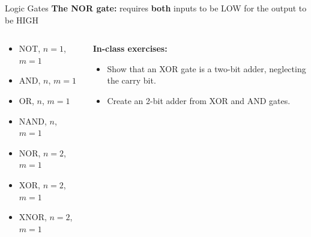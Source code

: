 \documentclass{beamer}
\begin{document}
\begin{frame}{Logic Gates}
\textbf{The NOR gate:} requires \textbf{both} inputs to be LOW for the output to be HIGH \\ \vspace{0.5cm}
\begin{columns}[T]
\begin{column}{0.5\textwidth}
\begin{itemize}
\item \alert{NOT, $n=1$, $m=1$}
\item \alert{AND, $n$, $m=1$}
\item \alert{OR, $n$, $m=1$}
\item \alert{NAND, $n$, $m=1$}
\item \alert{NOR, $n=2$, $m=1$}
\item \alert{XOR, $n=2$, $m=1$}
\item \alert{XNOR, $n=2$, $m=1$}
\end{itemize}
\end{column}
\begin{column}{0.5\textwidth}
\textbf{In-class exercises:}
\begin{itemize}
\item Show that an XOR gate is a two-bit adder, neglecting the carry bit.
\item Create an 2-bit adder from XOR and AND gates.
\end{itemize}
\end{column}
\end{columns}
\end{frame}
\end{document}
